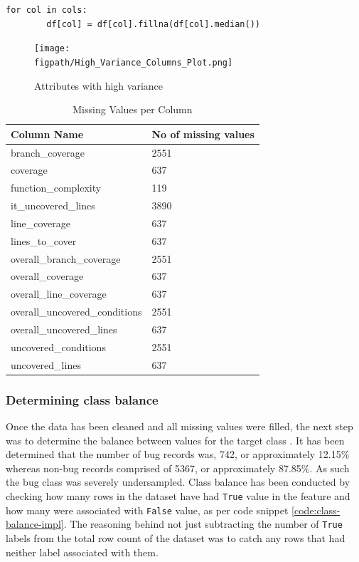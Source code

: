 \begin{code}
\label{code:missing-values-median-code}
\begin{verbatim}
for col in cols:
        df[col] = df[col].fillna(df[col].median())
\end{verbatim}
\end{code}

\begin{figure}[h!]
    \centering
    \texttt{[image: \\figpath/High\_Variance\_Columns\_Plot.png]}
    \caption{Attributes with high variance}
    \label{fig:high-variance}
\end{figure}

\begin{table}[h!]
\centering
\caption{Missing Values per Column}
\label{tbl:missing-values-per-col}
\begin{tabular}{@{}ll@{}}
\toprule
Column Name & No of missing values \\ \midrule
branch\_coverage & 2551 \\
coverage & 637 \\
function\_complexity & 119 \\
it\_uncovered\_lines & 3890 \\
line\_coverage & 637 \\
lines\_to\_cover & 637 \\
overall\_branch\_coverage & 2551 \\
overall\_coverage & 637 \\
overall\_line\_coverage & 637 \\
overall\_uncovered\_conditions & 2551 \\
overall\_uncovered\_lines & 637 \\
uncovered\_conditions & 2551 \\
uncovered\_lines & 637 \\ \bottomrule
\end{tabular}
\end{table}
\FloatBarrier

\subsubsection{Determining class balance} \label{sec:impl-data-analysis:class-balance}
Once the data has been cleaned and all missing values were filled, the next step was to determine the balance between values for the target class \isBug{}. It has been determined that the number of bug records was, 742, or approximately 12.15\% whereas non-bug records comprised of 5367, or approximately 87.85\%. As such the bug class was severely undersampled. Class balance has been conducted by checking how many rows in the dataset have had \texttt{True} value in the \isBug{} feature and how many were associated with \texttt{False} value, as per code snippet \ref{code:class-balance-impl}. The reasoning behind not just subtracting the number of \texttt{True} labels from the total row count of the dataset was to catch any rows that had neither label associated with them. 

